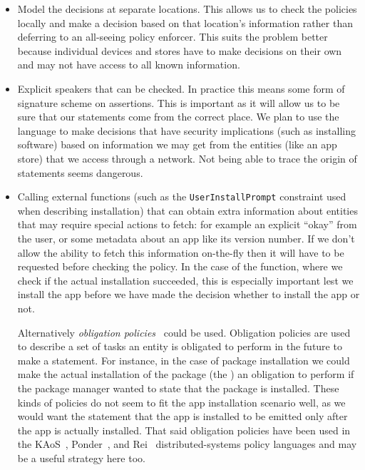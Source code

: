 \documentclass[a4paper,sfsidenotes]{%
  scrartcl%
}
\begin{document}
\begin{itemize}

  \item Model the decisions at separate locations.  This allows us to check the
    policies locally and make a decision based on that location's information
    rather than deferring to an all-seeing policy enforcer.  This suits the
    problem better because individual devices and stores have to make decisions
    on their own and may not have access to all known information.

  \item Explicit speakers that can be checked. In practice this means some form
    of signature scheme on assertions.  This is important as it will allow us to
    be sure that our statements come from the correct place.  We plan to use the
    language to make decisions that have security implications (such as
    installing software) based on information we may get from the entities (like
    an app store) that we access through a network.  Not being able to trace the
    origin of statements seems dangerous.

  \item Calling external functions (such as the
    \texttt{UserInstallPrompt} constraint used when describing installation)
    that can obtain extra information about entities that may require special
    actions to fetch: for example an explicit ``okay'' from the user, or some
    metadata about an app like its version number.  If we don't allow the ability
    to fetch this information on-the-fly then it will have to be requested
    before checking the policy.  In the case of the  function,
    where we check if the actual installation succeeded, this is especially
    important lest we install the app before we have made the decision whether
    to install the app or not.  
    
    Alternatively \emph{obligation policies}~\cite{Gama:2005tp,Gelfond:2008cl}
    could be used.  Obligation policies are used to describe a set of tasks an
    entity is obligated to perform in the future to make a statement.  For
    instance, in the case of package installation we could make the actual
    installation of the package (the ) an
    obligation to perform if the package manager wanted to state that the
    package is installed.  These kinds of policies do not seem to fit the app
    installation scenario well, as we would want the statement that the app is
    installed to be emitted only after the app is actually installed.  That said
    obligation policies have been used in the KAoS~\cite{Uszok:2003bn},
    Ponder~\cite{Damianou:2001ho,Twidle:2009fj}, and Rei~\cite{Kagal:2002ta}
    distributed-systems policy languages and may be a useful strategy here too.


\end{itemize}
\end{document}
